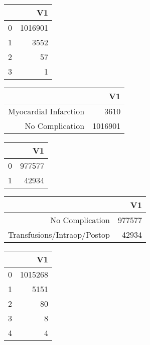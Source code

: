 \bigskip\bigskip
\centering
\begin{tabular}{rr}
  \hline
 & V1 \\ 
  \hline
0 & 1016901 \\ 
  1 & 3552 \\ 
  2 &  57 \\ 
  3 &   1 \\ 
   \hline
\end{tabular}

\bigskip\bigskip
\centering
\begin{tabular}{rr}
  \hline
 & V1 \\ 
  \hline
Myocardial Infarction & 3610 \\ 
  No Complication & 1016901 \\ 
   \hline
\end{tabular}

\bigskip\bigskip
\centering
\begin{tabular}{rr}
  \hline
 & V1 \\ 
  \hline
0 & 977577 \\ 
  1 & 42934 \\ 
   \hline
\end{tabular}

\bigskip\bigskip
\centering
\begin{tabular}{rr}
  \hline
 & V1 \\ 
  \hline
No Complication & 977577 \\ 
  Transfusions/Intraop/Postop & 42934 \\ 
   \hline
\end{tabular}

\bigskip\bigskip
\centering
\begin{tabular}{rr}
  \hline
 & V1 \\ 
  \hline
0 & 1015268 \\ 
  1 & 5151 \\ 
  2 &  80 \\ 
  3 &   8 \\ 
  4 &   4 \\ 
   \hline
\end{tabular}

